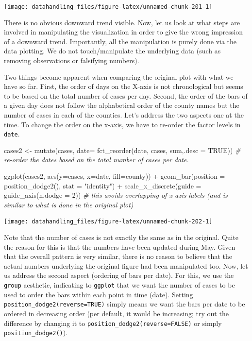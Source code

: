 \documentclass[
  12pt,
]{style/krantz}
\newenvironment{Shaded}{\begin{snugshade}}{\end{snugshade}}
\newcommand{\AttributeTok}[1]{\textcolor[rgb]{0.77,0.63,0.00}{#1}}
\newcommand{\CommentTok}[1]{\textcolor[rgb]{0.56,0.35,0.01}{\textit{#1}}}
\newcommand{\ConstantTok}[1]{\textcolor[rgb]{0.00,0.00,0.00}{#1}}
\newcommand{\DecValTok}[1]{\textcolor[rgb]{0.00,0.00,0.81}{#1}}
\newcommand{\FunctionTok}[1]{\textcolor[rgb]{0.00,0.00,0.00}{#1}}
\newcommand{\NormalTok}[1]{#1}
\newcommand{\OtherTok}[1]{\textcolor[rgb]{0.56,0.35,0.01}{#1}}
\newcommand{\SpecialCharTok}[1]{\textcolor[rgb]{0.00,0.00,0.00}{#1}}
\newcommand{\StringTok}[1]{\textcolor[rgb]{0.31,0.60,0.02}{#1}}
\begin{document}
\texttt{[image: datahandling\_files/figure-latex/unnamed-chunk-201-1]}

There is no obvious downward trend visible. Now, let us look at what steps are involved in manipulating the visualization in order to give the wrong impression of a downward trend. Importantly, all the manipulation is purely done via the data plotting. We do not touch/manipulate the underlying data (such as removing observations or falsifying numbers).

Two things become apparent when comparing the original plot with what we have so far. First, the order of days on the X-axis is not chronological but seems to be based on the total number of cases per day. Second, the order of the bars of a given day does not follow the alphabetical order of the county names but the number of cases in each of the counties. Let's address the two aspects one at the time. To change the order on the x-axis, we have to re-order the factor levels in \texttt{date}.

\begin{Shaded}
\begin{Highlighting}[]
\NormalTok{cases2 }\OtherTok{\textless{}{-}} \FunctionTok{mutate}\NormalTok{(cases, }\AttributeTok{date=} \FunctionTok{fct\_reorder}\NormalTok{(date, cases, sum,}\AttributeTok{.desc =} \ConstantTok{TRUE}\NormalTok{)) }\CommentTok{\# re{-}order the dates based on the total number of cases per date.}

\FunctionTok{ggplot}\NormalTok{(cases2, }\FunctionTok{aes}\NormalTok{(}\AttributeTok{y=}\NormalTok{cases, }\AttributeTok{x=}\NormalTok{date, }\AttributeTok{fill=}\NormalTok{county)) }\SpecialCharTok{+}
  \FunctionTok{geom\_bar}\NormalTok{(}\AttributeTok{position =} \FunctionTok{position\_dodge2}\NormalTok{(), }\AttributeTok{stat =} \StringTok{"identity"}\NormalTok{) }\SpecialCharTok{+}
  \FunctionTok{scale\_x\_discrete}\NormalTok{(}\AttributeTok{guide =} \FunctionTok{guide\_axis}\NormalTok{(}\AttributeTok{n.dodge =} \DecValTok{2}\NormalTok{))  }\CommentTok{\# this avoids overlapping of x{-}axis labels (and is similar to what is done in the original plot)}
\end{Highlighting}
\end{Shaded}

\texttt{[image: datahandling\_files/figure-latex/unnamed-chunk-202-1]}

Note that the number of cases is not exactly the same as in the original. Quite the reason for this is that the numbers have been updated during May. Given that the overall pattern is very similar, there is no reason to believe that the actual numbers underlying the original figure had been manipulated too. Now, let us address the second aspect (ordering of bars per date). For this, we use the \texttt{group} aesthetic, indicating to \texttt{ggplot} that we want the number of cases to be used to order the bars within each point in time (date). Setting \texttt{position\_dodge2(reverse=TRUE)} simply means we want the bars per date to be ordered in decreasing order (per default, it would be increasing; try out the difference by changing it to \texttt{position\_dodge2(reverse=FALSE)} or simply \texttt{position\_dodge2()}).
\end{document}

